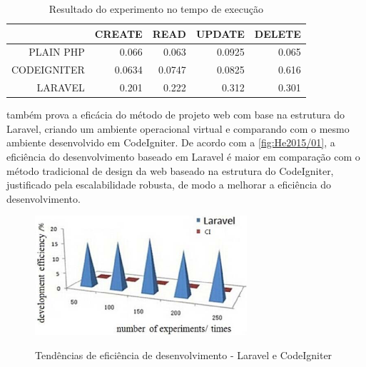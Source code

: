 \begin{table}[H]
    \centering
    \caption{Resultado do experimento no tempo de execução
    \label{tab:comparisonLaravel}}
    \begin{tabular}{rrrrr}
        \toprule
            & CREATE    & READ      & UPDATE    & DELETE \\
        \midrule
            PLAIN PHP   & 0.066     & 0.063    & 0.0925   & 0.065 \\
            CODEIGNITER & 0.0634    & 0.0747   & 0.0825   & 0.616 \\
            LARAVEL     & 0.201     & 0.222    & 0.312    & 0.301 \\
        \bottomrule
    \end{tabular}
\end{table}

 também prova a eficácia do método de projeto web com base na estrutura do Laravel, criando um ambiente operacional virtual e comparando com o mesmo ambiente desenvolvido em CodeIgniter. De acordo com a \autoref{fig:He2015/01}, a eficiência do desenvolvimento baseado em Laravel é maior em comparação com o método tradicional de design da web baseado na estrutura do CodeIgniter, justificado pela escalabilidade robusta, de modo a melhorar a eficiência do desenvolvimento.

\begin{figure}[H]
    \centering
    \caption{Tendências de eficiência de desenvolvimento - Laravel e CodeIgniter}
    \includegraphics[width=0.7\textwidth]{./dados/figuras/fig9}
    \label{fig:He2015/01}
\end{figure}

